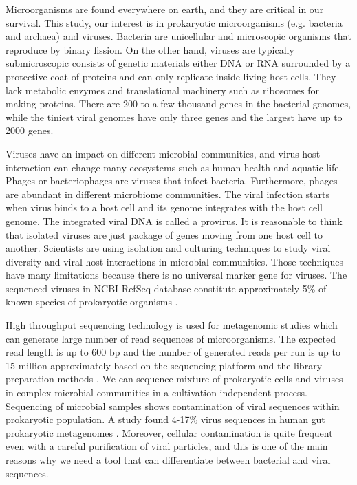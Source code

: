 \documentclass[conference]{IEEEtran}
\begin{document}
Microorganisms are found everywhere on earth, and they are critical in our survival. This study, our interest is in prokaryotic microorganisms (e.g. bacteria and archaea) and viruses. Bacteria are unicellular and microscopic organisms that reproduce by binary fission. On the other hand, viruses are typically submicroscopic consists of genetic materials either DNA or RNA surrounded by a protective coat of proteins and can only replicate inside living host cells. They lack metabolic enzymes and translational machinery such as ribosomes for making proteins. There are 200 to a few thousand genes in the bacterial genomes, while the tiniest viral genomes have only three genes and the largest have up to 2000 genes.

Viruses have an impact on different microbial communities, and virus-host interaction can change many ecosystems such as human health and aquatic life. Phages or bacteriophages are viruses that infect bacteria. Furthermore, phages are abundant in different microbiome communities. The viral infection starts when virus binds to a host cell and its genome integrates with the host cell genome. The integrated viral DNA is called a provirus. It is reasonable to think that isolated viruses are just package of genes moving from one host cell to another. Scientists are using isolation and culturing techniques to study viral diversity and viral-host interactions in microbial communities. Those techniques have many limitations because there is no universal marker gene for viruses. The sequenced viruses in NCBI RefSeq database constitute approximately 5\% of known species of prokaryotic organisms \cite{roux2015viral}.

High throughput sequencing technology is used for metagenomic studies which can generate large number of read  sequences of microorganisms. The expected read length is up to 600 bp and the number of generated reads per run is up to 15 million approximately based on the sequencing platform and the library preparation methods \cite{allali2017comparison}. We can sequence mixture of prokaryotic cells and viruses in complex microbial communities in a cultivation-independent process. Sequencing of microbial samples shows contamination of viral sequences within prokaryotic population. A study found 4-17\% virus sequences in human gut prokaryotic metagenomes \cite{minot2011human}. Moreover, cellular contamination is quite frequent even with a careful purification of viral particles, and this is one of the main reasons why we need a tool that can differentiate between bacterial and viral sequences.
\end{document}
